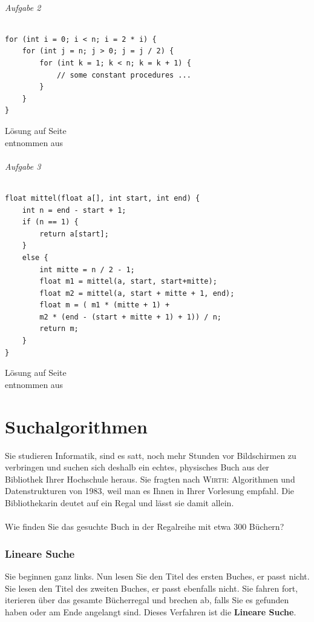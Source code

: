 \documentclass[11pt,a4paper]{scrartcl}
\begin{document}
\paragraph{Aufgabe 2} \quad
\begin{lstlisting}
for (int i = 0; i < n; i = 2 * i) {
	for (int j = n; j > 0; j = j / 2) {
		for (int k = 1; k < n; k = k + 1) {
			// some constant procedures ...		
		}	
	}
}
\end{lstlisting}
\begin{flushright}
Lösung auf Seite \pageref{a1.6:lsg} \\
entnommen aus \parencite{GrUeb}
\end{flushright}
\paragraph{Aufgabe 3} \quad
\begin{lstlisting}
float mittel(float a[], int start, int end) {
	int n = end - start + 1;
	if (n == 1) {
		return a[start];	
	}
	else {
		int mitte = n / 2 - 1;
		float m1 = mittel(a, start, start+mitte);
		float m2 = mittel(a, start + mitte + 1, end);
		float m = (	m1 * (mitte + 1) + 
		m2 * (end - (start + mitte + 1) + 1)) / n;
		return m;	
	}
}
\end{lstlisting}
\begin{flushright}
Lösung auf Seite \pageref{a1.7:lsg} \\
entnommen aus \parencite{GrUeb}
\end{flushright}
\part{Suchalgorithmen}
Sie studieren Informatik, sind es satt, noch mehr Stunden vor Bildschirmen zu verbringen und suchen sich deshalb ein echtes, physisches Buch aus der Bibliothek Ihrer Hochschule heraus. Sie fragten nach \glqq\textsc{Wirth}: Algorithmen und Datenstrukturen{\grqq} von 1983, weil man es Ihnen in Ihrer Vorlesung empfahl. Die Bibliothekarin deutet auf ein Regal und lässt sie damit allein. \\\\
Wie finden Sie das gesuchte Buch in der Regalreihe mit etwa 300 Büchern?
\section{Lineare Suche}
Sie beginnen ganz links. Nun lesen Sie den Titel des ersten Buches, er passt nicht. Sie lesen den Titel des zweiten Buches, er passt ebenfalls nicht. Sie fahren fort, iterieren über das gesamte Bücherregal und brechen ab, falls Sie es gefunden haben oder am Ende angelangt sind. Dieses Verfahren ist die \textbf{Lineare Suche}.
\end{document}

